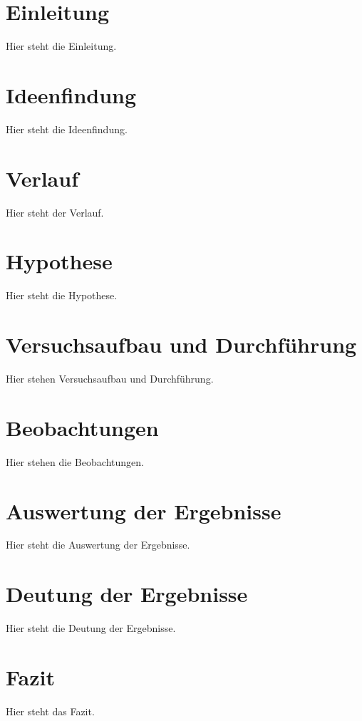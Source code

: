 \documentclass{Bericht}
\begin{document}
\maketitle


\tableofcontents
\clearpage

\section{Einleitung}
	Hier steht die Einleitung.

\section{Ideenfindung}
	Hier steht die Ideenfindung.

\section{Verlauf}
	Hier steht der Verlauf.

\section{Hypothese}
	Hier steht die Hypothese.

\section{Versuchsaufbau und Durchführung}
	Hier stehen Versuchsaufbau und Durchführung.

\section{Beobachtungen}
	Hier stehen die Beobachtungen.

\section{Auswertung der Ergebnisse}
	Hier steht die Auswertung der Ergebnisse.

\section{Deutung der Ergebnisse}
	Hier steht die Deutung der Ergebnisse.

\section{Fazit}
	Hier steht das Fazit.
	
\vfill %

\printbibliography
\end{document}
